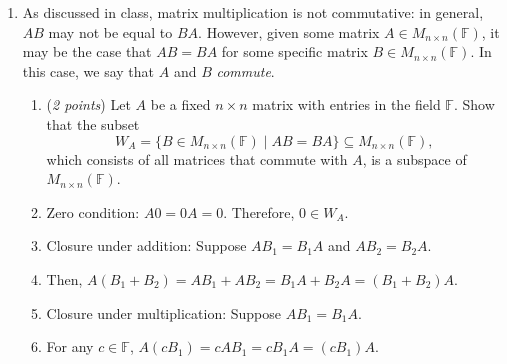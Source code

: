 \documentclass[11pt]{article}
\newcommand{\bbF}{\mathbb{F}}
\newcommand{\bbR}{\mathbb{R}}
\theoremstyle{definition}
\numberwithin{equation}{subsection}
\begin{document}
\begin{enumerate}
\begin{enumerate}
\item (\emph{2 points}) $T\colon \bbR[t]_{\leq 3} \to \bbR^3$; \hspace{0.6in} $T(p(t)) = \begin{bmatrix} p(2)\\ p(1) \\ p(-1) \end{bmatrix}$.
\item[] Basis $=\{1,t,t^2,t^3\}$. 
\item[] $T(1)=\begin{bmatrix}1\\1\\1\end{bmatrix},\ T(t)=\begin{bmatrix}2\\1\\-1\end{bmatrix},\ T(t^2)=\begin{bmatrix}4\\1\\1\end{bmatrix},\ T(t^3)=\begin{bmatrix}8\\1\\-1\end{bmatrix}$, therefore $[T]=\begin{bmatrix}1&2&4&8\\1&1&1&1\\1&-1&1&-1\end{bmatrix}$.

\end{enumerate}

\item As discussed in class, matrix multiplication is not commutative: in general, $AB$ may not be equal to $BA$. However, given some matrix $A \in M_{n\times n}(\bbF)$, it may be the case that $AB=BA$ for some specific matrix $B \in M_{n\times n}(\bbF)$. In this case, we say that $A$ and $B$ \emph{commute}. 

\begin{enumerate}

\item (\emph{2 points}) Let $A$ be a fixed $n\times n$ matrix with entries in the field $\mathbb{F}$. Show that the subset
$$W_A=\{B\in M_{n\times n}(\mathbb{F}) \;|\; AB=BA\}\subseteq M_{n\times n}(\mathbb{F}),$$
which consists of all matrices that commute with $A$, is a subspace of $M_{n\times n}(\mathbb{F})$.  
\item[] Zero condition: $A0=0A=0$. Therefore, $0\in W_A$.
\item[] Closure under addition: Suppose $AB_1=B_1A$ and $AB_2=B_2A$.
\item[] Then, $A(B_1+B_2)=AB_1+AB_2=B_1A+B_2A=(B_1+B_2)A$.
\item[] Closure under multiplication: Suppose $AB_1=B_1A$.
\item[] For any $c\in \bbF$, $A(cB_1)=cAB_1=cB_1A=(cB_1)A.$


\end{enumerate}
\end{enumerate}
\end{document}
